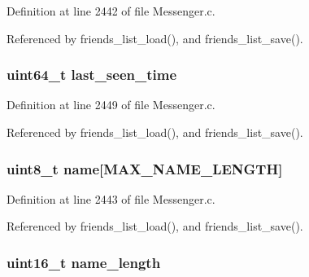 Definition at line 2442 of file Messenger.\+c.



Referenced by friends\+\_\+list\+\_\+load(), and friends\+\_\+list\+\_\+save().

\hypertarget{struct_s_a_v_e_d___f_r_i_e_n_d_a8f99c48eb6b3ea472806495135ab6792}{
\subsubsection[{last\+\_\+seen\+\_\+time}]{\setlength{\rightskip}{0pt plus 5cm}uint64\+\_\+t last\+\_\+seen\+\_\+time}}\label{struct_s_a_v_e_d___f_r_i_e_n_d_a8f99c48eb6b3ea472806495135ab6792}


Definition at line 2449 of file Messenger.\+c.



Referenced by friends\+\_\+list\+\_\+load(), and friends\+\_\+list\+\_\+save().

\hypertarget{struct_s_a_v_e_d___f_r_i_e_n_d_a11b8cc6595eea79e65c978209278e683}{
\subsubsection[{name}]{\setlength{\rightskip}{0pt plus 5cm}uint8\+\_\+t name\mbox{[}{\bf M\+A\+X\+\_\+\+N\+A\+M\+E\+\_\+\+L\+E\+N\+G\+T\+H}\mbox{]}}}\label{struct_s_a_v_e_d___f_r_i_e_n_d_a11b8cc6595eea79e65c978209278e683}


Definition at line 2443 of file Messenger.\+c.



Referenced by friends\+\_\+list\+\_\+load(), and friends\+\_\+list\+\_\+save().

\hypertarget{struct_s_a_v_e_d___f_r_i_e_n_d_a3573d7a906b26e9999cd74f2c4066601}{
\subsubsection[{name\+\_\+length}]{\setlength{\rightskip}{0pt plus 5cm}uint16\+\_\+t name\+\_\+length}}\label{struct_s_a_v_e_d___f_r_i_e_n_d_a3573d7a906b26e9999cd74f2c4066601}


